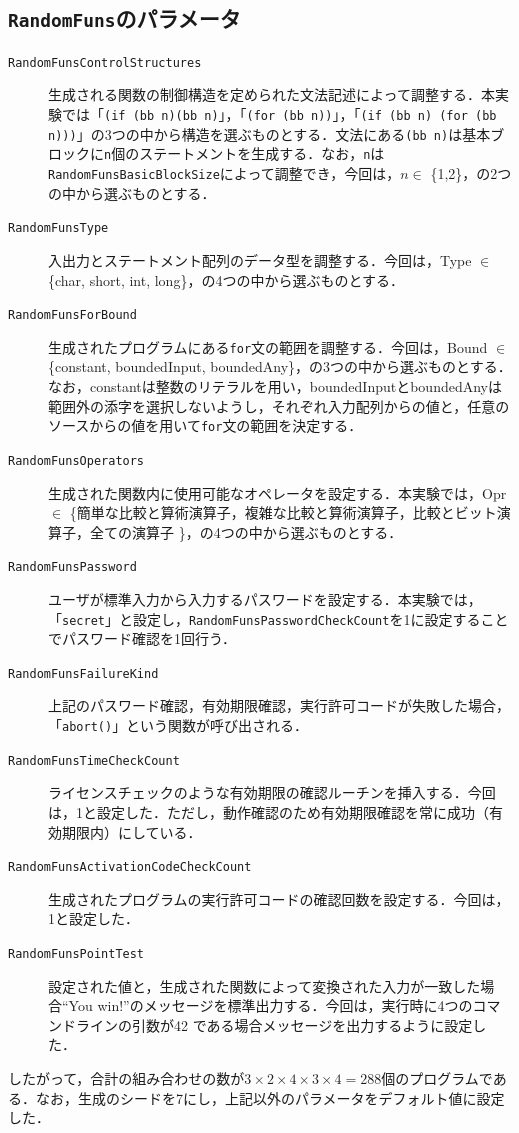 \documentclass[12pt]{jarticle}
\begin{document}
\begin{appendices}
\newpage


\section{\texttt{RandomFuns}のパラメータ} \label{appendix:randfuns}
\begin{description}
  \item[\texttt{RandomFunsControlStructures}]\hfill\break
  生成される関数の制御構造を定められた文法記述によって調整する．本実験では「\texttt{(if (bb n)(bb n)}」，「\texttt{(for (bb n))}」，「\texttt{(if (bb n) (for (bb n)))}」の3つの中から構造を選ぶものとする．文法にある\texttt{(bb n)}は基本ブロックに\texttt{n}個のステートメントを生成する．なお，\texttt{n}は\texttt{RandomFunsBasicBlockSize}によって調整でき，今回は，$n\in$ \{1,2\}，の2つの中から選ぶものとする．
  \item[\texttt{RandomFunsType}]\hfill\break
  入出力とステートメント配列のデータ型を調整する．今回は，Type $\in$ \{char, short, int, long\}，の4つの中から選ぶものとする．
  \item[\texttt{RandomFunsForBound}]\hfill\break
  生成されたプログラムにある\texttt{for}文の範囲を調整する．今回は，Bound $\in$ \{constant, boundedInput, boundedAny\}，の3つの中から選ぶものとする．なお，constantは整数のリテラルを用い，boundedInputとboundedAnyは範囲外の添字を選択しないようし，それぞれ入力配列からの値と，任意のソースからの値を用いて\texttt{for}文の範囲を決定する．
  \item[\texttt{RandomFunsOperators}]\hfill\break
  生成された関数内に使用可能なオペレータを設定する．本実験では，Opr $\in$ \{簡単な比較と算術演算子，複雑な比較と算術演算子，比較とビット演算子，全ての演算子 \}，の4つの中から選ぶものとする．
  \item[\texttt{RandomFunsPassword}]\hfill\break
  ユーザが標準入力から入力するパスワードを設定する．本実験では，「\texttt{secret}」と設定し，\texttt{RandomFunsPasswordCheckCount}を1に設定することでパスワード確認を1回行う．
  \item[\texttt{RandomFunsFailureKind}]\hfill\break
  上記のパスワード確認，有効期限確認，実行許可コードが失敗した場合，「\texttt{abort()}」という関数が呼び出される．
  \item[\texttt{RandomFunsTimeCheckCount}]\hfill\break
  ライセンスチェックのような有効期限の確認ルーチンを挿入する．今回は，1と設定した．ただし，動作確認のため有効期限確認を常に成功（有効期限内）にしている．
  \item[\texttt{RandomFunsActivationCodeCheckCount}]\hfill\break
  生成されたプログラムの実行許可コードの確認回数を設定する．今回は，1と設定した．
  \item[\texttt{RandomFunsPointTest}]\hfill\break
  設定された値と，生成された関数によって変換された入力が一致した場合``You win!''のメッセージを標準出力する．今回は，実行時に4つのコマンドラインの引数が42
  である場合メッセージを出力するように設定した．
\end{description}
したがって，合計の組み合わせの数が$3\times2\times4\times3\times4=288$個のプログラムである．なお，生成のシードを7にし，上記以外のパラメータをデフォルト値に設定した．



\end{appendices}
\end{document}
